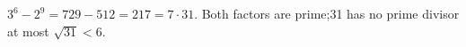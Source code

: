 $3^6-2^9=729-512=217=\boxed{7\cdot31}$. Both factors are prime;31 has no prime divisor at most $\sqrt{31}<6$.
